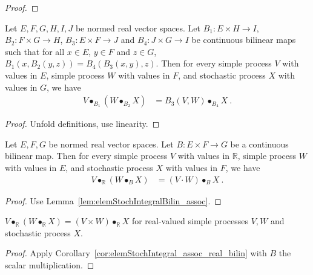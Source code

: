 \begin{proof}
  \leanok
\end{proof}


\begin{lemma}\label{lem:elemStochIntegralBilin_assoc}
  \leanok
Let $E, F, G, H, I, J$ be normed real vector spaces.
Let $B_1 : E \times H \to I$, $B_2 : F \times G \to H$, $B_3 : E \times F \to J$ and $B_4 : J \times G \to I$ be continuous bilinear maps such that for all $x \in E$, $y \in F$ and $z \in G$, $B_1(x, B_2(y, z)) = B_4(B_3(x, y), z)$.
Then for every simple process $V$ with values in $E$, simple process $W$ with values in $F$, and stochastic process $X$ with values in $G$, we have
\begin{align*}
  V \bullet_{B_1} (W \bullet_{B_2} X)
  &= B_3(V, W) \bullet_{B_4} X
  \: .
\end{align*}
\end{lemma}

\begin{proof}
  \leanok
Unfold definitions, use linearity.
\end{proof}


\begin{corollary}\label{cor:elemStochIntegral_assoc_real_bilin}
Let $E, F, G$ be normed real vector spaces.
Let $B : E \times F \to G$ be a continuous bilinear map.
Then for every simple process $V$ with values in $\mathbb{R}$, simple process $W$ with values in $E$, and stochastic process $X$ with values in $F$, we have
\begin{align*}
  V \bullet_{\mathbb{R}} (W \bullet_{B} X)
  &= (V \cdot W) \bullet_{B} X
  \: .
\end{align*}
\end{corollary}

\begin{proof}
Use Lemma~\ref{lem:elemStochIntegralBilin_assoc}.
\end{proof}


\begin{lemma}\label{lem:elemStochIntegral_assoc}
$V \bullet_{\mathbb{R}} (W \bullet_{\mathbb{R}} X) = (V \times W) \bullet_{\mathbb{R}} X$ for real-valued simple processes $V, W$ and stochastic process $X$.
\end{lemma}

\begin{proof}
Apply Corollary~\ref{cor:elemStochIntegral_assoc_real_bilin} with $B$ the scalar multiplication.
\end{proof}


